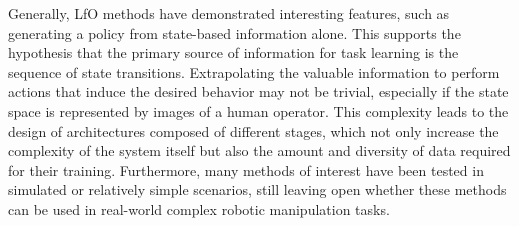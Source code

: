 

Generally, LfO methods have demonstrated interesting features, such as generating a policy from state-based information alone. This supports the hypothesis that the primary source of information for task learning is the sequence of state transitions. Extrapolating the valuable information to perform actions that induce the desired behavior may not be trivial, especially if the state space is represented by images of a human operator. This complexity leads to the design of architectures composed of different stages, which not only increase the complexity of the system itself but also the amount and diversity of data required for their training. Furthermore, many methods of interest have been tested in simulated or relatively simple scenarios, still leaving open whether these methods can be used in real-world complex robotic manipulation tasks.
